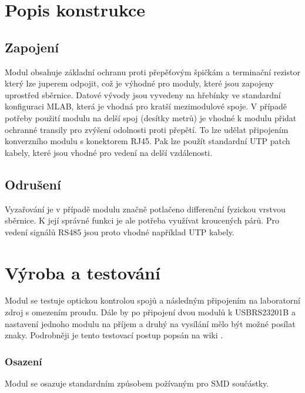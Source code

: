 \documentclass[12pt,a4paper,oneside]{article}
\begin{document}
\newpage
\section{Popis konstrukce}

\subsection{Zapojení}
Modul obsahuje základní ochranu proti přepěťovým špičkám a terminační rezistor který lze juperem odpojit, což je výhodné pro moduly, které jsou zapojeny uprostřed sběrnice.  Datové vývody  jsou vyvedeny na hřebínky ve standardní konfiguraci MLAB, která je vhodná pro kratší mezimodulové spoje. V případě potřeby použití modulu na delší spoj (desítky metrů) je vhodné k modulu přidat ochranné transily pro zvýšení odolnosti proti přepětí. To lze udělat připojením konverzního modulu s konektorem RJ45. Pak lze použít standardní UTP patch kabely, které jsou vhodné pro vedení na delší vzdálenosti.   



\subsection{Odrušení}

Vyzařování je v případě modulu značně potlačeno  differenční fyzickou vrstvou sběrnice.  K její správné funkci je ale potřeba využívat kroucených párů.  Pro vedení signálů RS485 jsou proto vhodné například UTP kabely.  

\section{Výroba a testování}

Modul se testuje optickou kontrolou spojů a následným připojením na laboratorní zdroj s omezením proudu. Dále by po připojení dvou modulů k USBRS23201B a nastavení jednoho modulu na příjem a druhý na vysílání mělo být možné posílat znaky. Podrobněji je tento testovací postup popsán na wiki \cite{wiki-TTLRS48501A}.


\subsubsection{Osazení}

Modul se osazuje standardním způsobem požívaným pro SMD součástky. 
\end{document}

